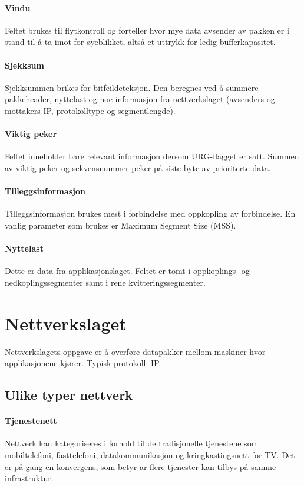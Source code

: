 \documentclass[11pt,a4paper]{article}
\begin{document}
\paragraph{Vindu} Feltet brukes til flytkontroll og forteller hvor mye data avsender av pakken er i stand til å ta imot for øyeblikket, altså et uttrykk for ledig bufferkapasitet.
\paragraph{Sjekksum} Sjekksummen brikes for bitfeildeteksjon. Den beregnes ved å summere pakkeheader, nyttelast og noe informasjon fra nettverkslaget (avsenders og mottakers IP, protokolltype og segmentlengde).
\paragraph{Viktig peker} Feltet inneholder bare relevant informasjon dersom URG-flagget er satt. Summen av viktig peker og sekvensnummer peker på siste byte av prioriterte data.
\paragraph{Tilleggsinformasjon} Tilleggsinformasjon brukes mest i forbindelse med oppkopling av forbindelse. En vanlig parameter som brukes er Maximum Segment Size (MSS).
\paragraph{Nyttelast} Dette er data fra applikasjonslaget. Feltet er tomt i oppkoplings- og nedkoplingssegmenter samt i rene kvitteringssegmenter.

\section{Nettverkslaget}
Nettverkslagets oppgave er å overføre datapakker mellom maskiner hvor applikasjonene kjører. Typisk protokoll: IP.

\subsection{Ulike typer nettverk}
\paragraph{Tjenestenett}
Nettverk kan kategoriseres i forhold til de tradisjonelle tjenestene som mobiltelefoni, fasttelefoni, datakommunikasjon og kringkastingsnett for TV. Det er på gang en konvergens, som betyr ar flere tjenester kan tilbys på samme infrastruktur.
\end{document}
